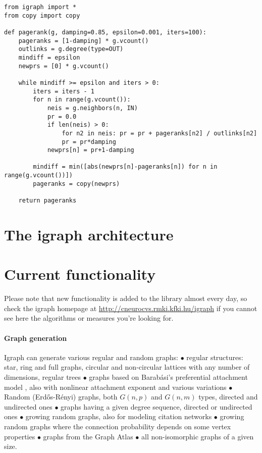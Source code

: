 \documentclass[twoside]{book}%
\begin{document}
\begin{verbatim}
from igraph import *
from copy import copy

def pagerank(g, damping=0.85, epsilon=0.001, iters=100):
    pageranks = [1-damping] * g.vcount()
    outlinks = g.degree(type=OUT)
    mindiff = epsilon
    newprs = [0] * g.vcount()
    
    while mindiff >= epsilon and iters > 0:
        iters = iters - 1
        for n in range(g.vcount()):
            neis = g.neighbors(n, IN)
            pr = 0.0
            if len(neis) > 0:
                for n2 in neis: pr = pr + pageranks[n2] / outlinks[n2]
                pr = pr*damping
            newprs[n] = pr+1-damping
	    
        mindiff = min([abs(newprs[n]-pageranks[n]) for n in range(g.vcount())])
        pageranks = copy(newprs)
	
    return pageranks
\end{verbatim}

\section{The igraph architecture}

\section{Current functionality}

Please note that new functionality is added to the library almost every
day, so check the igraph homepage at
\url{http://cneurocvs.rmki.kfki.hu/igraph} if you cannot see here the
algorithms or measures you're looking for. 

\paragraph{Graph generation} Igraph can generate various regular and
random graphs: $\bullet$ regular structures: star, ring and full
graphs, circular and non-circular lattices with any number of
dimensions, regular trees $\bullet$ graphs based on Barab\'asi's
preferential attachment model \cite{barabasi99a}, also with nonlinear
attachment exponent and various variations $\bullet$ Random
(Erd\H{o}s-R\'enyi) graphs, both $G(n,p)$ and $G(n,m)$ types, directed
and undirected ones $\bullet$ graphs having a given degree sequence,
directed or undirected ones $\bullet$ growing random graphs, also for
modeling citation networks $\bullet$ growing random graphs where the
connection probability depends on some vertex properties $\bullet$
graphs from the Graph Atlas \cite{read98} $\bullet$ all
non-isomorphic graphs of a given size.
\end{document}

